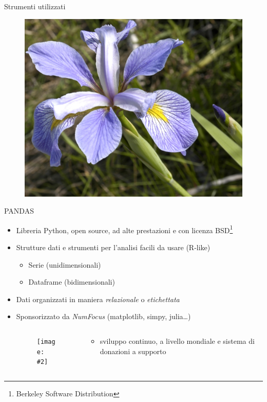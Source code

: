 \documentclass[xcolor={dvipsnames}]{beamer}
\newcommand{\figcen}[2]{
	\begin{figure}
		\begin{center}
			\texttt{[image: \#2]}
		\end{center}
	\end{figure}
}
\begin{document}
\begin{frame}{Strumenti utilizzati}
\begin{figure}[htbp]
\begin{minipage}[c]{.55\textwidth}
				\end{minipage}
				\includegraphics[scale=.15]{virginica}
			\end{figure}
		\end{frame}

		\begin{frame}{PANDAS}
			\begin{itemize}
				\item Libreria Python, open source, ad alte prestazioni e con licenza BSD\footnote[frame]{Berkeley Software Distribution}
				\item Strutture dati e strumenti per l'analisi facili da usare (R-like)
				\begin{itemize}
					\item Serie (unidimensionali)
					\item Dataframe (bidimensionali)
				\end{itemize}
				\item Dati organizzati in maniera \emph{relazionale} o \emph{etichettata}
				\item Sponsorizzato da \emph{NumFocus} (matplotlib, simpy, julia\dots)
				\begin{columns}
					\begin{column}{.3\textwidth}
						\figcen{\columnwidth}{numFocus}
					\end{column}
					\begin{column}{.7\textwidth}
						\begin{itemize}						
							\item sviluppo continuo, a livello mondiale e sistema di donazioni a supporto
						\end{itemize}						
					\end{column}
				\end{columns}
			\end{itemize}
		\end{frame}
\end{document}
